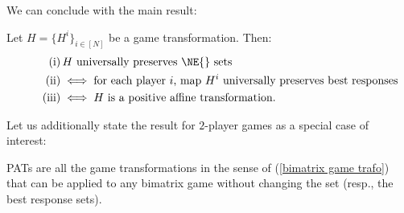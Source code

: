 We can conclude with the main result:
\begin{thm}
\label{equiv charact of PAT}
Let $H = \{H^i\}_{i \in [N]}$ be a game transformation. Then:
\begin{align}
\label{second:mt1} \tag{i}
&\,H \text{ universally preserves \NE{} sets} \\
\label{second:mt2} \tag{ii}
&\iff \text{for each player~$i$, map $H^i$ universally preserves best responses} \\
\label{second:mt3} \tag{iii}
&\iff H \text{ is a positive affine transformation.}
\end{align}
\end{thm}

Let us additionally state the result for $2$-player games as a special case of interest:
\begin{cor}
\label{bimatrix consequence}
PATs are all the game transformations in the sense of (\ref{bimatrix game trafo}) that can be applied to any bimatrix game without changing the \NE{} set (resp., the best response sets).
\end{cor}


